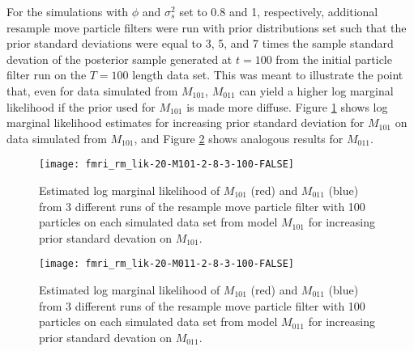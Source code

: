 \documentclass{article}
\begin{document}
\clearpage

For the simulations with $\phi$ and $\sigma^2_s$ set to 0.8 and 1, respectively, additional resample move particle filters were run with prior distributions set such that the prior standard deviations were equal to 3, 5, and 7 times the sample standard devation of the posterior sample generated at $t = 100$ from the initial particle filter run on the $T = 100$ length data set. This was meant to illustrate the point that, even for data simulated from $M_{101}$, $M_{011}$ can yield a higher log marginal likelihood if the prior used for $M_{101}$ is made more diffuse. Figure \ref{fig:fmri-lik-sd-M101} shows log marginal likelihood estimates for increasing prior standard deviation for $M_{101}$ on data simulated from $M_{101}$, and Figure \ref{fig:fmri-lik-sd-M011} shows analogous results for $M_{011}$.

\begin{figure}[ht]
\texttt{[image: fmri\_rm\_lik-20-M101-2-8-3-100-FALSE]}
\caption{Estimated log marginal likelihood of $M_{101}$ (red) and $M_{011}$ (blue) from 3 different runs of the resample move particle filter with 100 particles on each simulated data set from model $M_{101}$ for increasing prior standard devation on $M_{101}$.} \label{fig:fmri-lik-sd-M101}
\end{figure}

\begin{figure}[ht]
\texttt{[image: fmri\_rm\_lik-20-M011-2-8-3-100-FALSE]}
\caption{Estimated log marginal likelihood of $M_{101}$ (red) and $M_{011}$ (blue) from 3 different runs of the resample move particle filter with 100 particles on each simulated data set from model $M_{011}$ for increasing prior standard devation on $M_{011}$.} \label{fig:fmri-lik-sd-M011}
\end{figure}

\clearpage



\end{document}
